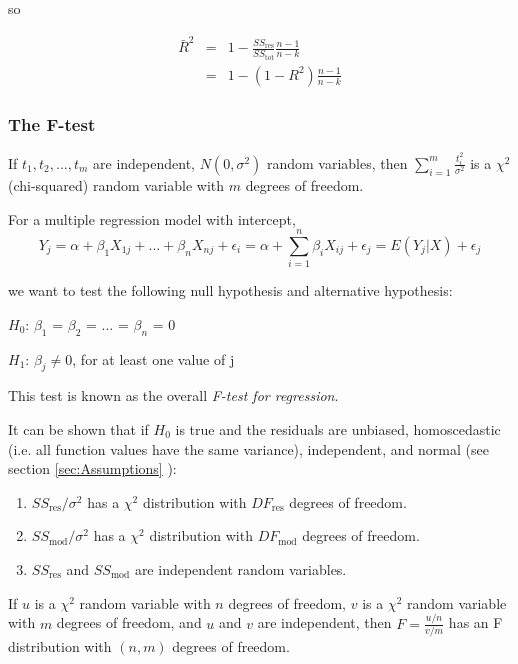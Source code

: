 so

\begin{eqnarray}
  \bar{R}^2 &=& 1 - \frac{SS_\text{res}}{SS_\text{tot}} \frac{n - 1}{n - k} \nonumber  \\
    &=& 1 - (1 - R^2)\frac{n - 1}{n - k}
\end{eqnarray}

\subsubsection{The F-test}

If $t_1, t_2, ... , t_m$ are independent, $N(0, \sigma^2)$ random variables, then $\sum_{i=1}^m \frac{t_i^2}{\sigma^2}$ is a $\chi^2$ (chi-squared) random variable with $m$ degrees of freedom.

For a multiple regression model with intercept,
\begin{equation}
  Y_j = \alpha + \beta_1 X_{1j} + ... + \beta_n X_{nj} + \epsilon_i = \alpha + \sum_{i=1}^n \beta_i X_{ij} + \epsilon_j = E(Y_j | X) + \epsilon_j
\end{equation}

we want to test the following null hypothesis and alternative hypothesis:

        $H_0$:   $\beta_1$ = $\beta_2$ = ... = $\beta_n$ = 0

        $H_1$:   $\beta_j \neq 0$, for at least one value of j

This test is known as the overall \emph{F-test for regression}.

It can be shown that if $H_0$ is true and the residuals are unbiased, homoscedastic (i.e. all function values have the same variance), independent, and normal (see section \ref{sec:Assumptions} ):

\begin{enumerate}
  \item $SS_\text{res} / \sigma^2$ has a $\chi^2$ distribution with $DF_\text{res}$ degrees of freedom.
  \item $SS_\text{mod} / \sigma^2$ has a $\chi^2$ distribution with $DF_\text{mod}$ degrees of freedom.
  \item $SS_\text{res}$ and $SS_\text{mod}$ are independent random variables.
\end{enumerate}

If $u$ is a $\chi^2$ random variable with $n$ degrees of freedom, $v$ is a $\chi^2$ random variable with $m$ degrees of freedom, and $u$ and $v$ are independent, then $F = \frac{u/n}{v/m}$ has an F distribution with $(n,m)$ degrees of freedom.


